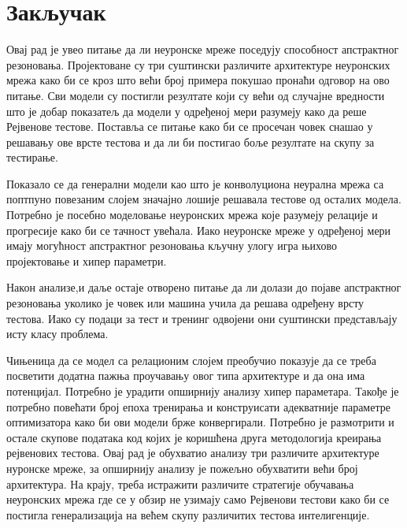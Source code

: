 \documentclass[a4paper, 12pt, master, utf8]{etf}
\begin{document}
\chapter{Закључак }
\label{sec:6}

Овај рад је увео питање да ли неуронске мреже поседују способност апстрактног резоновања. Пројектоване су три суштински различите архитектуре неуронских мрежа како би се кроз што већи број
примера покушао пронаћи одговор на ово питање. Сви модели су постигли резултате који су већи од случајне вредности што је добар показатељ да модели у одређеној мери разумеју како да реше Рејвенове тестове.
Поставља се питање како би се просечан човек снашао у решавању ове врсте тестова и да ли би постигао боље резултате на скупу за тестирање. 
\newline

Показало се да генерални модели као што је конволуциона неурална мрежа са поптпуно повезаним слојем значајно лошије решавала тестове од осталих модела. Потребно је посебно моделовање неуронских мрежа које разумеју релације и прогресије 
како би се тачност увећала. Иако неуронске мреже у одређеној мери имају могућност апстрактног резоновања кључну улогу игра њихово пројектовање и хипер параметри.
\newline

Након анализе,и даље остаје отворено питање да ли долази до појаве апстрактног резоновања уколико је човек или машина учила да решава одређену врсту тестова. Иако су подаци за тест и тренинг одвојени они суштински представљају исту класу проблема.
\newline

Чињеница да се модел са релационим слојем преобучио показује да се треба посветити додатна пажња проучавању овог типа архитектуре и да она има потенцијал. Потребно је урадити опширнију анализу хипер параметара. Такође је потребно
повећати број епоха тренирања и конструисати адекватније параметре оптимизатора како би ови модели брже конвергирали. Потребно је размотрити и остале скупове података код којих је коришћена друга методологија креирања рејвенових тестова. Овај рад је обухватио анализу три различите
архитектуре нуронске мреже, за опширнију анализу је пожељно обухватити већи број архитектура. На крају, треба истражити различите стратегије обучавања неуронских мрежа где се у обзир не узимају само Рејвенови тестови како би се постигла генерализација на већем скупу различитих тестова интелигенције.





\end{document}
